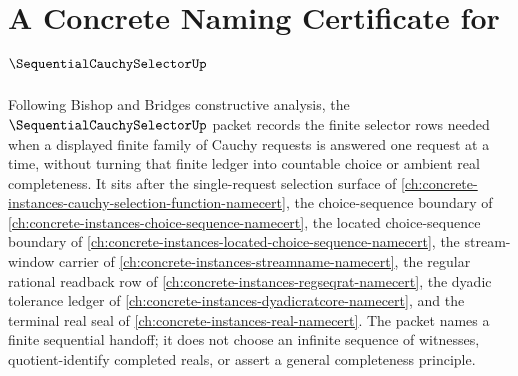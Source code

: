 \chapter{A Concrete Naming Certificate for $\SequentialCauchySelectorUp$}
\label{ch:concrete-instances-sequential-cauchy-selector-namecert}

Following Bishop and Bridges constructive analysis, the $\SequentialCauchySelectorUp$ packet records the finite selector rows needed when a displayed finite family of Cauchy requests is answered one request at a time, without turning that finite ledger into countable choice or ambient real completeness. It sits after the single-request selection surface of \autoref{ch:concrete-instances-cauchy-selection-function-namecert}, the choice-sequence boundary of \autoref{ch:concrete-instances-choice-sequence-namecert}, the located choice-sequence boundary of \autoref{ch:concrete-instances-located-choice-sequence-namecert}, the stream-window carrier of \autoref{ch:concrete-instances-streamname-namecert}, the regular rational readback row of \autoref{ch:concrete-instances-regseqrat-namecert}, the dyadic tolerance ledger of \autoref{ch:concrete-instances-dyadicratcore-namecert}, and the terminal real seal of \autoref{ch:concrete-instances-real-namecert}. The packet names a finite sequential handoff; it does not choose an infinite sequence of witnesses, quotient-identify completed reals, or assert a general completeness principle.

